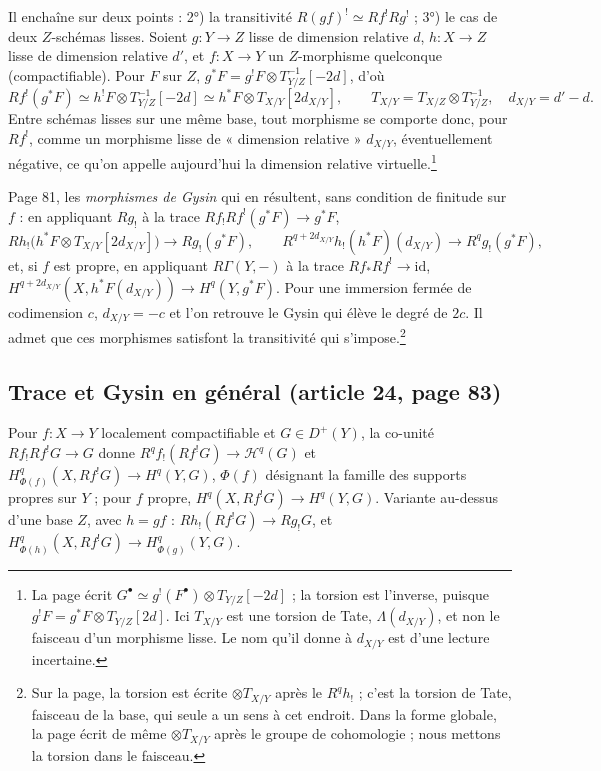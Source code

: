 \documentclass[11pt,a4paper]{article}
\begin{document}
Il enchaîne sur deux points : 2°) la transitivité $R(gf)^{!} \simeq
Rf^{!}Rg^{!}$ ; 3°) le cas de deux $Z$-schémas lisses. Soient $g : Y \to Z$
lisse de dimension relative $d$, $h : X \to Z$ lisse de dimension relative $d'$,
et $f : X \to Y$ un $Z$-morphisme quelconque (compactifiable). Pour $F$ sur $Z$,
$g^{*}F = g^{!}F \otimes T_{Y/Z}^{-1}[-2d]$, d'où
\[
  Rf^{!}(g^{*}F) \simeq h^{!}F \otimes T_{Y/Z}^{-1}[-2d] \simeq h^{*}F \otimes
  T_{X/Y}[2d_{X/Y}], \qquad T_{X/Y} = T_{X/Z} \otimes T_{Y/Z}^{-1},\quad
  d_{X/Y} = d' - d.
\]
Entre schémas lisses sur une même base, tout morphisme se comporte donc, pour
$Rf^{!}$, comme un morphisme lisse de « dimension relative » $d_{X/Y}$,
éventuellement négative, ce qu'on appelle aujourd'hui la dimension relative
virtuelle.\footnote{La page écrit $G^{\bullet} \simeq g^{!}(F^{\bullet}) \otimes
T_{Y/Z}[-2d]$ ; la torsion est l'inverse, puisque $g^{!}F = g^{*}F \otimes
T_{Y/Z}[2d]$. Ici $T_{X/Y}$ est une torsion de Tate, $\Lambda(d_{X/Y})$, et non
le faisceau d'un morphisme lisse. Le nom qu'il donne à $d_{X/Y}$ est d'une
lecture incertaine.}

Page 81, les \emph{morphismes de Gysin} qui en résultent, sans condition de
finitude sur $f$ : en appliquant $Rg_{!}$ à la trace $Rf_{!}Rf^{!}(g^{*}F) \to
g^{*}F$,
\[
  Rh_{!}\bigl(h^{*}F \otimes T_{X/Y}[2d_{X/Y}]\bigr) \longrightarrow
  Rg_{!}(g^{*}F), \qquad
  R^{q+2d_{X/Y}}h_{!}(h^{*}F)(d_{X/Y}) \longrightarrow R^{q}g_{!}(g^{*}F),
\]
et, si $f$ est propre, en appliquant $R\Gamma(Y, -)$ à la trace
$Rf_{*}Rf^{!} \to \mathrm{id}$, $H^{q+2d_{X/Y}}(X,
h^{*}F(d_{X/Y})) \to H^{q}(Y, g^{*}F)$. Pour une immersion fermée de
codimension $c$, $d_{X/Y} = -c$ et l'on retrouve le Gysin qui élève le degré de
$2c$. Il admet que ces morphismes satisfont la transitivité qui
s'impose.\footnote{Sur la page, la torsion est écrite $\otimes T_{X/Y}$ après
le $R^{q}h_{!}$ ; c'est la torsion de Tate, faisceau de la base, qui
seule a un sens à cet endroit. Dans la forme globale, la page écrit de même
$\otimes T_{X/Y}$ après le groupe de cohomologie ; nous mettons la torsion dans
le faisceau.}

\subsection*{Trace et Gysin en général (article 24, page 83)}

Pour $f : X \to Y$ localement compactifiable et $G \in D^{+}(Y)$, la co-unité
$Rf_{!}Rf^{!}G \to G$ donne $R^{q}f_{!}(Rf^{!}G) \to \mathcal{H}^{q}(G)$ et
$H^{q}_{\Phi(f)}(X, Rf^{!}G) \to H^{q}(Y, G)$, $\Phi(f)$ désignant la famille
des supports propres sur $Y$ ; pour $f$ propre, $H^{q}(X, Rf^{!}G) \to H^{q}(Y,
G)$. Variante au-dessus d'une base $Z$, avec $h = gf$ : $Rh_{!}(Rf^{!}G) \to
Rg_{!}G$, et $H^{q}_{\Phi(h)}(X, Rf^{!}G) \to H^{q}_{\Phi(g)}(Y, G)$.
\end{document}

